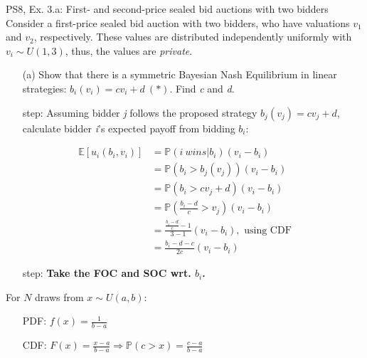\begin{frame}{PS8, Ex. 3.a: First- and second-price sealed bid auctions with two bidders}
    Consider a first-price sealed bid auction with two bidders, who have valuations $v_1$ and $v_2$, respectively. These values are distributed independently uniformly with $v_i\sim U(1,3)$, thus, the values are \textit{private}.
    \vspace{-4pt}
    \begin{itemize}
      \item[(a)] Show that there is a symmetric Bayesian Nash Equilibrium in linear strategies: $b_i(v_i) = cv_i + d\ (*)$. Find \textit{c} and \textit{d}.
    \end{itemize}
    \vspace{-8pt}
    \begin{multicols}{2}
      \begin{itemize}
        \item[\nth{1} step:] Assuming bidder \textit{j} follows the proposed strategy $b_j(v_j) = cv_j + d$, calculate bidder \textit{i}'s expected payoff from bidding $b_i$:
      \end{itemize}
      \vspace{-4pt}
      \begin{align*}
        \mathbb{E}[u_i(b_i,v_i)]&=\mathbb{P}(i\ wins|b_i)(v_i-b_i)\\
                                &=\mathbb{P}(b_i>b_j(v_j))(v_i-b_i)\\
                                &=\mathbb{P}(b_i>cv_j+d)(v_i-b_i)\\
                                &=\mathbb{P}\left(\frac{b_i-d}{c}>v_j\right)(v_i-b_i)\\
                                &=\frac{\frac{b_i-d}{c}-1}{3-1}(v_i-b_i),\text{ using CDF}\\
                                &=\frac{b_i-d-c}{2c}(v_i-b_i)
      \end{align*}
      \vspace{-10pt}
      \begin{itemize}
        \item[\nth{2} step:] \textbf{Take the FOC and SOC wrt. $b_i$.}
      \end{itemize}
      \vfill\null\columnbreak
      For $N$ draws from $x\sim U(a, b):$
      \vspace{-6pt}
      \begin{enumerate}
        \item[PDF:] $f(x)=\frac{1}{b-a}$
        \item[CDF:] $F(x)=\frac{x-a}{b-a}\Rightarrow\mathbb{P}(c>x)=\frac{c-a}{b-a}$

\end{enumerate}
\end{multicols}
\end{frame}
